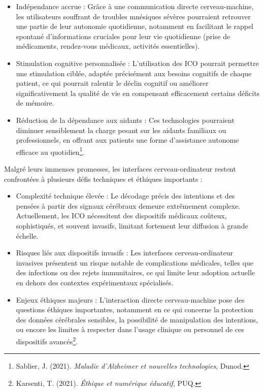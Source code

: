 \documentclass[11pt,a4paper]{report}
\begin{document}
\begin{itemize}

    \item Indépendance accrue :
Grâce à une communication directe cerveau-machine, les utilisateurs souffrant de troubles mnésiques sévères pourraient retrouver une partie de leur autonomie quotidienne, notamment en facilitant le rappel spontané d’informations cruciales pour leur vie quotidienne (prise de médicaments, rendez-vous médicaux, activités essentielles).

    \item Stimulation cognitive personnalisée :
L’utilisation des ICO pourrait permettre une stimulation ciblée, adaptée précisément aux besoins cognitifs de chaque patient, ce qui pourrait ralentir le déclin cognitif ou améliorer significativement la qualité de vie en compensant efficacement certains déficits de mémoire.

    \item Réduction de la dépendance aux aidants :
Ces technologies pourraient diminuer sensiblement la charge pesant sur les aidants familiaux ou professionnels, en offrant aux patients une forme d’assistance autonome efficace au quotidien\footnote{Sablier, J. (2021). \textit{Maladie d’Alzheimer et nouvelles technologies}, Dunod.}.
 
\end{itemize}

Malgré leurs immenses promesses, les interfaces cerveau-ordinateur restent confrontées à plusieurs défis techniques et éthiques importants :

\begin{itemize}

    \item Complexité technique élevée :
Le décodage précis des intentions et des pensées à partir des signaux cérébraux demeure extrêmement complexe. Actuellement, les ICO nécessitent des dispositifs médicaux coûteux, sophistiqués, et souvent invasifs, limitant fortement leur diffusion à grande échelle.

    \item Risques liés aux dispositifs invasifs :
Les interfaces cerveau-ordinateur invasives présentent un risque notable de complications médicales, telles que des infections ou des rejets immunitaires, ce qui limite leur adoption actuelle en dehors des contextes expérimentaux spécialisés.

    \item Enjeux éthiques majeurs :
L’interaction directe cerveau-machine pose des questions éthiques importantes, notamment en ce qui concerne la protection des données cérébrales sensibles, la possibilité de manipulation des intentions, ou encore les limites à respecter dans l’usage clinique ou personnel de ces dispositifs avancés\footnote{Karsenti, T. (2021). \textit{Éthique et numérique éducatif}, PUQ.}.

\end{itemize}
\end{document}
